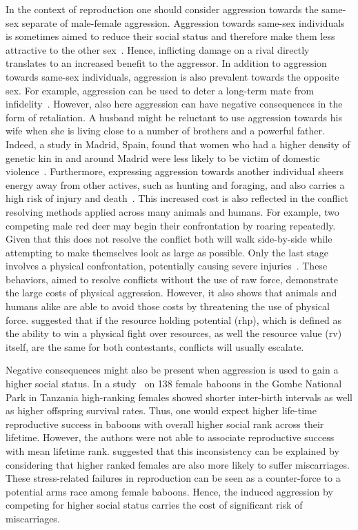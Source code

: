 In the context of reproduction one should consider aggression towards the same-sex separate of male-female aggression.
Aggression towards same-sex individuals is sometimes aimed to reduce their social status and therefore make them less attractive to the other sex~\cite{Buss1990}.
Hence, inflicting damage on a rival directly translates to an increased benefit to the aggressor.
In addition to aggression towards same-sex individuals, aggression is also prevalent towards the opposite sex.
For example, aggression can be used to deter a long-term mate from infidelity~\cite{Daly1982}.
However, also here aggression can have negative consequences in the form of retaliation.
A husband might be reluctant to use aggression towards his wife when she is living close to a number of brothers and a powerful father.
Indeed, a study in Madrid, Spain, found that women who had a higher density of genetic kin in and around Madrid were less likely to be victim of domestic violence~\cite{Figueredo1995}.
Furthermore, expressing aggression towards another individual sheers energy away from other actives, such as hunting and foraging, and also carries a high risk of injury and death~\cite{Packer1995}.  
This increased cost is also reflected in the conflict resolving methods applied across many animals and humans.
For example, two competing male red deer may begin their confrontation by roaring repeatedly.
Given that this does not resolve the conflict both will walk side-by-side while attempting to make themselves look as large as possible.
Only the last stage involves a physical confrontation, potentially causing severe injuries~\cite{Clutton-Brock1979}.
These behaviors, aimed to resolve conflicts without the use of raw force, demonstrate the large costs of physical aggression.
However, it  also shows that animals and humans alike are able to avoid those costs by threatening the use of physical force.
\citet{Maxson2005} suggested that if the resource holding potential (\acrshort{rhp}), which is defined as the ability to win a physical fight over resources,  as well the resource value (\acrshort{rv}) itself, are the same for both contestants, conflicts will usually escalate.

Negative consequences might also be present when aggression is used to gain a higher social status.
In a study~\cite{Packer1995} on 138 female baboons in the Gombe National Park in Tanzania high-ranking females showed shorter inter-birth intervals as well as higher offspring survival rates.
Thus, one would expect higher life-time reproductive success in baboons with overall higher social rank across their lifetime.
However, the authors were not able to associate reproductive success with mean lifetime rank.
\citet{Packer1995} suggested that this inconsistency can be explained by considering that higher ranked females are also more likely to suffer  miscarriages.
These stress-related failures in reproduction can be seen as a counter-force to a potential arms race among female baboons.
Hence, the induced aggression by competing for higher social status carries the cost of significant risk of miscarriages.

